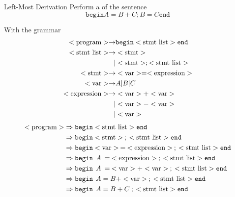 \begin{example}[]{Left-Most Derivation}
  Perform a  of the sentence
  \begin{equation*}
    \mathtt{begin} A = B + C ; B = C \mathtt{end}
  \end{equation*}

  With the grammar
  \begin{align*}
    <\text{program}> \rightarrow &\mathtt{begin} <\text{stmt list}> \mathtt{end} \\
    <\text{stmt list}> \rightarrow &<\text{stmt}> \\
                          \vert &<\text{stmt}> ; <\text{stmt list}> \\
    <\text{stmt}> \rightarrow &<\text{var}> = <\text{expression}> \\
    <\text{var}> \rightarrow &A \vert B \vert C \\
    <\text{expression}> \rightarrow &<\text{var}> + <\text{var}> \\
                          \vert &<\text{var}> - <\text{var}> \\
                          \vert &<\text{var}>
  \end{align*}
  \tcblower{}
  \begin{align*}
    \Nonterminal{program} &\Rightarrow \mathtt{begin} \Nonterminal{stmt list} \mathtt{end} \\
                          &\Rightarrow \mathtt{begin} \Nonterminal{stmt}\: ; \: \Nonterminal{stmt list} \mathtt{end} \\
                          &\Rightarrow \mathtt{begin} \Nonterminal{var} \: = \: \Nonterminal{expression}\: ; \: \Nonterminal{stmt list} \mathtt{end} \\
                          &\Rightarrow \mathtt{begin} \:\: A \: = \: \Nonterminal{expression}\: ; \: \Nonterminal{stmt list} \mathtt{end} \\
                          &\Rightarrow \mathtt{begin} \:\: A \: = \: \Nonterminal{var} + \Nonterminal{var}\: ; \: \Nonterminal{stmt list} \mathtt{end} \\
                          &\Rightarrow \mathtt{begin} \:\: A = B + \Nonterminal{var}\: ; \: \Nonterminal{stmt list} \mathtt{end} \\
                          &\Rightarrow \mathtt{begin} \:\: A = B + C\: ; \: \Nonterminal{stmt list} \mathtt{end} \\

\end{align*}
\end{example}
